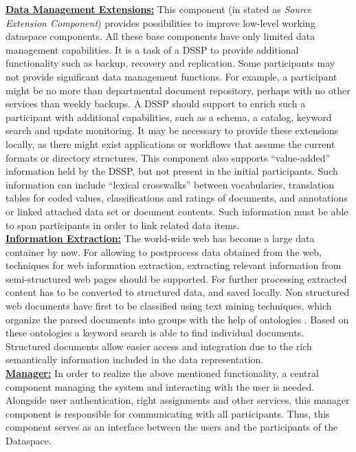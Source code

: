 \uline{\textbf{Data Management Extensions:}} This component (in \cite{Halevy:2006:PDS:1142351.1142352} stated as \textit{Source Extension Component}) provides possibilities to improve low-level working dataspace components. All these base components have only limited data management capabilities. It is a task of a DSSP to provide additional functionality such as backup, recovery and replication. Some participants may not provide significant data management functions. For example, a participant might be no more than departmental document repository, perhaps with no other services than weekly backups. A DSSP should support to enrich such a participant with additional capabilities, such as a schema, a catalog, keyword search and update monitoring. It may be necessary to provide these extensions locally, as there might exist applications or workflows that assume the current formats or directory structures.	
This component also supports ``value-added'' information held by the DSSP, but not present in the initial participants. Such information can include ``lexical crosswalks'' between vocabularies, translation tables for coded values, classifications and ratings of documents, and annotations or linked attached data set or document contents. Such information must be able to span participants in order to link related data items.\\

\uline{\textbf{Information Extraction:}} The world-wide web has become a large data container by now. For allowing to postprocess data obtained from the web, techniques for web information extraction, extracting relevant information from semi-structured web pages should be supported. For further processing extracted content has to be converted to structured data, and saved locally. Non structured web documents have first to be classified using text mining techniques, which organize the parsed documents into groups with the help of ontologies \cite{conf/wise/HeQZW04}. Based on these ontologies a keyword search is able to find individual documents. Structured documents allow easier access and integration due to the rich semantically information included in the data representation.\\

\uline{\textbf{Manager:}} In order to realize the above mentioned functionality, a central component managing the system and interacting with the user is needed. Alongside user authentication, right assignments and other services, this manager component is responsible for communicating with all participants. Thus, this component serves as an interface between the users and the participants of the Dataspace.\\

